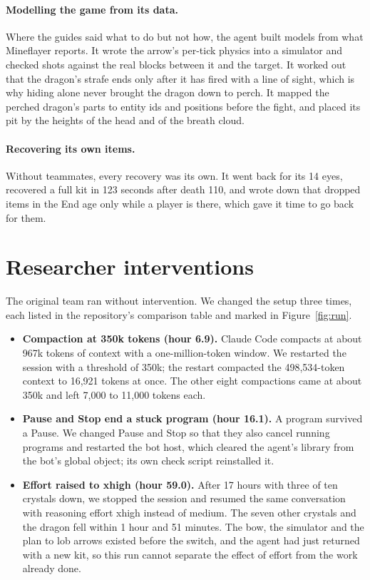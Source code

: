 \documentclass[11pt,a4paper]{article}
\begin{document}
\paragraph{Modelling the game from its data.} Where the guides said what to do but not how, the agent built models from what Mineflayer reports. It wrote the arrow's per-tick physics into a simulator and checked shots against the real blocks between it and the target. It worked out that the dragon's strafe ends only after it has fired with a line of sight, which is why hiding alone never brought the dragon down to perch. It mapped the perched dragon's parts to entity ids and positions before the fight, and placed its pit by the heights of the head and of the breath cloud.

\paragraph{Recovering its own items.} Without teammates, every recovery was its own. It went back for its 14 eyes, recovered a full kit in 123 seconds after death 110, and wrote down that dropped items in the End age only while a player is there, which gave it time to go back for them.

\section{Researcher interventions}
\label{sec:interventions}

The original team ran without intervention. We changed the setup three times, each listed in the repository's comparison table and marked in Figure~\ref{fig:run}.

\begin{itemize}
  \item \textbf{Compaction at 350k tokens (hour 6.9).} Claude Code compacts at about 967k tokens of context with a one-million-token window. We restarted the session with a threshold of 350k; the restart compacted the 498,534-token context to 16,921 tokens at once. The other eight compactions came at about 350k and left 7,000 to 11,000 tokens each.
  \item \textbf{Pause and Stop end a stuck program (hour 16.1).} A program survived a Pause. We changed Pause and Stop so that they also cancel running programs and restarted the bot host, which cleared the agent's library from the bot's global object; its own check script reinstalled it.
  \item \textbf{Effort raised to xhigh (hour 59.0).} After 17 hours with three of ten crystals down, we stopped the session and resumed the same conversation with reasoning effort xhigh instead of medium. The seven other crystals and the dragon fell within 1 hour and 51 minutes. The bow, the simulator and the plan to lob arrows existed before the switch, and the agent had just returned with a new kit, so this run cannot separate the effect of effort from the work already done.
\end{itemize}
\end{document}
